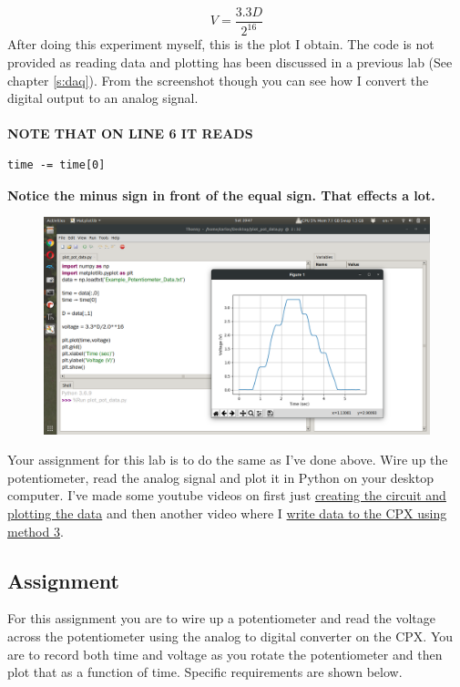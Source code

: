 \begin{equation}
V = \frac{3.3D}{2^{16}}
\end{equation}
After doing this experiment myself, this is the plot I obtain. The code is not provided as reading data and plotting has been discussed in a previous lab (See chapter \ref{s:daq}). From the screenshot though you can see how I convert the digital output to an analog signal.
\ \\
\ \\
{\bf NOTE THAT ON LINE 6 IT READS}
\begin{verbatim}
time -= time[0]
\end{verbatim}
{\bf Notice the minus sign in front of the equal sign. That effects a lot.}
\begin{figure}[H]
  \begin{center}
    \includegraphics[width=\textwidth]{Figures/plotting_analogio.png}
  \end{center}
\end{figure}
Your assignment for this lab is to do the same as I’ve done above. Wire up the potentiometer, read the analog signal and plot it in Python on your desktop computer. I’ve made some youtube videos on first just \href{https://youtu.be/_gnDvPOvPqk}{creating the circuit and plotting the data} and then another video where I \href{https://youtu.be/9UF3OVUIYjU}{write data to the CPX using method 3}.

\subsection{Assignment}

For this assignment you are to wire up a potentiometer and read the voltage across the potentiometer using the analog to digital converter on the CPX. You are to record both time and voltage as you rotate the potentiometer and then plot that as a function of time. Specific requirements are shown below.

